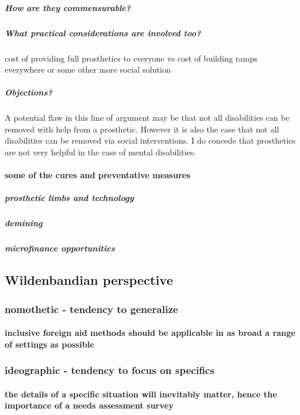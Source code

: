 \documentclass{lps}
\begin{document}
\subparagraph{How are they commensurable?}

\subparagraph{What practical considerations are involved too?}

cost of providing full prosthetics to everyone vs cost of building ramps
everywhere or some other more social solution

\subparagraph{Objections?}

A potential flaw in this line of argument may be that not all disabilities can
be removed with help from a prosthetic. However it is also the case that not
all disabilities can be removed via social interventions. I do concede that
prosthetics are not very helpful in the case of mental disabilities. 

\paragraph{some of the cures and preventative measures}

\subparagraph{prosthetic limbs and technology}

\subparagraph{demining}

\subparagraph{microfinance opportunities}

\subsection{Wildenbandian perspective}

\subsubsection{nomothetic - tendency to generalize}

\paragraph{inclusive foreign aid methods should be applicable in as broad a
range of settings as possible}

\subsubsection{ ideographic - tendency to focus on specifics}

\paragraph{the details of a specific situation will inevitably matter, hence
the importance of a needs assessment survey}
\end{document}
